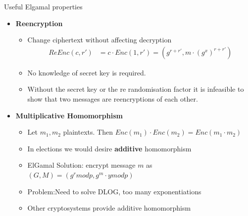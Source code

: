 \documentclass{beamer}
\begin{document}
\begin{frame}[allowframebreaks]{Useful Elgamal properties}
\begin{itemize}
\item \textbf{Reencryption}
\begin{itemize}
\item Change ciphertext without affecting decryption
\begin{align*}
 ReEnc(c,r') & = c \cdot Enc(1,r') = (g^{r+r'},m \cdot (g^x)^{r+r'}) 
\end{align*}
\item No knowledge of secret key is required.
\item Without the secret key or the re randomisation factor it is infeasible to show that two messages are reencryptions of each other.
\end{itemize}
\item \textbf{Multiplicative Homomorphism}
\begin{itemize}
\item Let $m_1, m_2$ plaintexts. Then\textbf{ $Enc(m_1) \cdot Enc(m_2) = Enc(m_1 \cdot m_2)$}
\item In elections we would desire \textbf{additive} homomorphism
\item ElGamal Solution: encrypt message $m$ as $(G,M) = (g^r mod p ,g^m \cdot y mod p)$
\item Problem:Need to solve DLOG, too many exponentiations
\item Other cryptosystems provide additive homomorphism
\end{itemize}
\end{itemize}
\end{frame}
\end{document}

